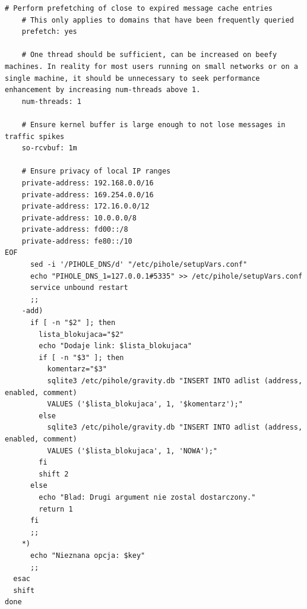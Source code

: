 \documentclass{article}
\begin{document}
\begin{lstlisting}[caption={skrypt konfiguracyjny Pi-hole: \textit{pihole\_config.sh}}]
    # Perform prefetching of close to expired message cache entries
    # This only applies to domains that have been frequently queried
    prefetch: yes

    # One thread should be sufficient, can be increased on beefy machines. In reality for most users running on small networks or on a single machine, it should be unnecessary to seek performance enhancement by increasing num-threads above 1.
    num-threads: 1

    # Ensure kernel buffer is large enough to not lose messages in traffic spikes
    so-rcvbuf: 1m

    # Ensure privacy of local IP ranges
    private-address: 192.168.0.0/16
    private-address: 169.254.0.0/16
    private-address: 172.16.0.0/12
    private-address: 10.0.0.0/8
    private-address: fd00::/8
    private-address: fe80::/10
EOF
      sed -i '/PIHOLE_DNS/d' "/etc/pihole/setupVars.conf"
      echo "PIHOLE_DNS_1=127.0.0.1#5335" >> /etc/pihole/setupVars.conf
      service unbound restart
      ;;
    -add)
      if [ -n "$2" ]; then
        lista_blokujaca="$2"
        echo "Dodaje link: $lista_blokujaca"
        if [ -n "$3" ]; then
          komentarz="$3"
          sqlite3 /etc/pihole/gravity.db "INSERT INTO adlist (address, enabled, comment)
          VALUES ('$lista_blokujaca', 1, '$komentarz');"
        else
          sqlite3 /etc/pihole/gravity.db "INSERT INTO adlist (address, enabled, comment)
          VALUES ('$lista_blokujaca', 1, 'NOWA');"
        fi
        shift 2
      else
        echo "Blad: Drugi argument nie zostal dostarczony."
        return 1
      fi
      ;;
    *)
      echo "Nieznana opcja: $key"
      ;;
  esac
  shift
done
\end{lstlisting}
\end{document}
